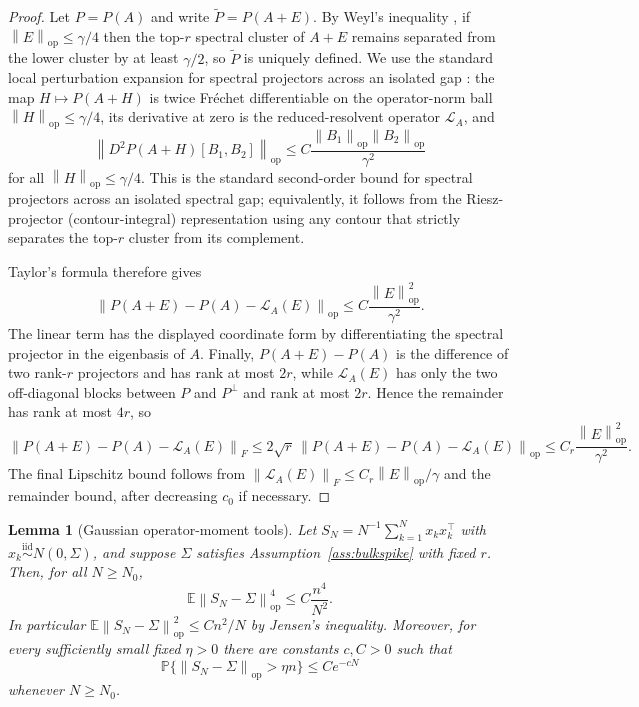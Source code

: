 \documentclass[11pt]{article}
\theoremstyle{tightplain}
\newtheorem{lemma}[theorem]{Lemma}
\theoremstyle{tightdef}
\DeclareMathOperator{\op}{op}
\newcommand{\E}{\mathbb E}
\newcommand{\Prob}{\mathbb P}
\newcommand{\norm}[1]{\left\lVert #1 \right\rVert}
\newcommand{\iid}{\stackrel{\mathrm{iid}}{\sim}}
\begin{document}
\begin{proof}
Let $P=P(A)$ and write $\widetilde P=P(A+E)$. By Weyl's inequality
\cite[Ch.~III]{Bhatia1997}, if $\norm E_{\op}\le \gamma/4$ then the top-$r$
spectral cluster of $A+E$ remains separated from the lower cluster by at least
$\gamma/2$, so $\widetilde P$ is uniquely defined. We use the standard local
perturbation expansion for spectral projectors across an isolated gap
\cite{Kato1995,DavisKahan1970}: the map $H\mapsto P(A+H)$ is twice Fr\'echet
differentiable on the operator-norm ball $\norm H_{\op}\le\gamma/4$, its
derivative at zero is the reduced-resolvent operator $\mathcal L_A$, and
\[
\norm{D^2P(A+H)[B_1,B_2]}_{\op}
\le
C\frac{\norm{B_1}_{\op}\norm{B_2}_{\op}}{\gamma^2}
\]
for all $\norm H_{\op}\le\gamma/4$. This is the standard second-order bound for
spectral projectors across an isolated spectral gap; equivalently, it follows
from the Riesz-projector (contour-integral) representation
\cite[Ch.~II]{Kato1995} using any contour that strictly separates the top-$r$
cluster from its complement.

Taylor's formula therefore gives
\[
\norm{P(A+E)-P(A)-\mathcal L_A(E)}_{\op}
\le
C\frac{\norm E_{\op}^2}{\gamma^2}.
\]
The linear term has the displayed coordinate form by differentiating the
spectral projector in the eigenbasis of $A$. Finally, $P(A+E)-P(A)$ is the
difference of two rank-$r$ projectors and has rank at most $2r$, while
$\mathcal L_A(E)$ has only the two off-diagonal blocks between $P$ and
$P^\perp$ and rank at most $2r$. Hence the remainder has rank at most $4r$, so
\[
\norm{P(A+E)-P(A)-\mathcal L_A(E)}_F
\le
2\sqrt r\,\norm{P(A+E)-P(A)-\mathcal L_A(E)}_{\op}
\le
C_r\frac{\norm E_{\op}^2}{\gamma^2}.
\]
The final Lipschitz bound follows from
$\norm{\mathcal L_A(E)}_F\le C_r\norm E_{\op}/\gamma$ and the remainder bound,
after decreasing $c_0$ if necessary.
\end{proof}

\begin{lemma}[Gaussian operator-moment tools]\label{lem:covopmoments}
Let $S_N=N^{-1}\sum_{k=1}^N x_kx_k^\top$ with
$x_k\iid N(0,\Sigma)$, and suppose $\Sigma$ satisfies
Assumption~\ref{ass:bulkspike} with fixed $r$. Then, for all $N\ge N_0$,
\[
\E\norm{S_N-\Sigma}_{\op}^4\le C\frac{n^4}{N^2}.
\]
In particular $\E\norm{S_N-\Sigma}_{\op}^2\le Cn^2/N$ by Jensen's inequality.
Moreover, for every sufficiently small fixed $\eta>0$ there are constants
$c,C>0$ such that
\[
\Prob\bigl\{\norm{S_N-\Sigma}_{\op}>\eta n\bigr\}\le Ce^{-cN}
\]
whenever $N\ge N_0$.
\end{lemma}
\end{document}
